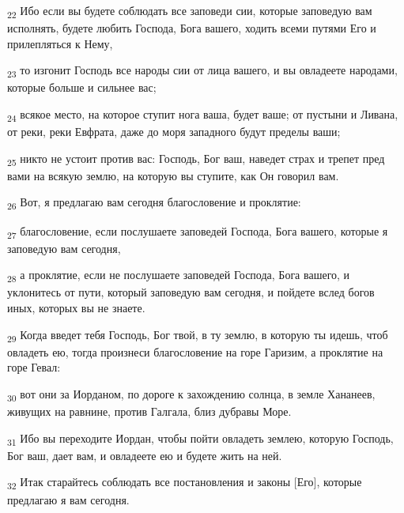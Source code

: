 \begin{tcolorbox}
\textsubscript{22} Ибо если вы будете соблюдать все заповеди сии, которые заповедую вам исполнять, будете любить Господа, Бога вашего, ходить всеми путями Его и прилепляться к Нему,
\end{tcolorbox}
\begin{tcolorbox}
\textsubscript{23} то изгонит Господь все народы сии от лица вашего, и вы овладеете народами, которые больше и сильнее вас;
\end{tcolorbox}
\begin{tcolorbox}
\textsubscript{24} всякое место, на которое ступит нога ваша, будет ваше; от пустыни и Ливана, от реки, реки Евфрата, даже до моря западного будут пределы ваши;
\end{tcolorbox}
\begin{tcolorbox}
\textsubscript{25} никто не устоит против вас: Господь, Бог ваш, наведет страх и трепет пред вами на всякую землю, на которую вы ступите, как Он говорил вам.
\end{tcolorbox}
\begin{tcolorbox}
\textsubscript{26} Вот, я предлагаю вам сегодня благословение и проклятие:
\end{tcolorbox}
\begin{tcolorbox}
\textsubscript{27} благословение, если послушаете заповедей Господа, Бога вашего, которые я заповедую вам сегодня,
\end{tcolorbox}
\begin{tcolorbox}
\textsubscript{28} а проклятие, если не послушаете заповедей Господа, Бога вашего, и уклонитесь от пути, который заповедую вам сегодня, и пойдете вслед богов иных, которых вы не знаете.
\end{tcolorbox}
\begin{tcolorbox}
\textsubscript{29} Когда введет тебя Господь, Бог твой, в ту землю, в которую ты идешь, чтоб овладеть ею, тогда произнеси благословение на горе Гаризим, а проклятие на горе Гевал:
\end{tcolorbox}
\begin{tcolorbox}
\textsubscript{30} вот они за Иорданом, по дороге к захождению солнца, в земле Хананеев, живущих на равнине, против Галгала, близ дубравы Море.
\end{tcolorbox}
\begin{tcolorbox}
\textsubscript{31} Ибо вы переходите Иордан, чтобы пойти овладеть землею, которую Господь, Бог ваш, дает вам, и овладеете ею и будете жить на ней.
\end{tcolorbox}
\begin{tcolorbox}
\textsubscript{32} Итак старайтесь соблюдать все постановления и законы [Его], которые предлагаю я вам сегодня.
\end{tcolorbox}
